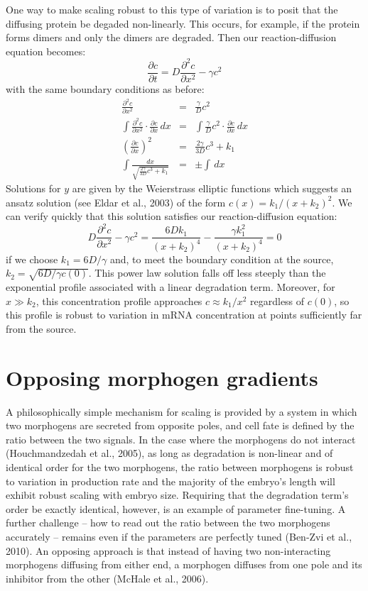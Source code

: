 \documentclass{article}
\begin{document}
One way to make scaling robust to this type of variation is to posit that the diffusing protein be degaded non-linearly. This occurs, for example, if the protein forms dimers and only the dimers are degraded. Then our reaction-diffusion equation becomes:
\[ \frac{\partial c}{\partial t} = D \frac{\partial^2 c}{\partial x^2} - \gamma c^2 \]
with the same boundary conditions as before:
\begin{eqnarray*}
 \frac{\partial^2 c}{\partial x^2} & = & \frac{\gamma}{D} c^2\\
\int  \frac{\partial^2 c}{\partial x^2} \cdot \frac{\partial c}{\partial x} \, dx & = & \int  \frac{\gamma}{D} c^2 \cdot \frac{\partial c}{\partial x} \, dx\\
\left(\frac{\partial c}{\partial x} \right)^2 & = &  \frac{2 \gamma}{3D} c^3 + k_1\\
\int \frac{dx}{\sqrt{\frac{2 \gamma}{3D} c^3 + k_1}} & = & \pm \int \, dx
\end{eqnarray*}
Solutions for $y$ are given by the Weierstrass elliptic functions which suggests an ansatz solution (see Eldar et al., 2003) of the form $c(x)= k_1/(x+k_2)^2$. We can verify quickly that this solution satisfies our reaction-diffusion equation:
\[ D \frac{\partial^2 c}{\partial x^2} - \gamma c^2 = \frac{6D k_1}{\left(x+k_2\right)^4} - \frac{\gamma k_1^2}{\left(x+k_2\right)^4} = 0 \]
if we choose $k_1=6D/\gamma$ and, to meet the boundary condition at the source, $k_2=\sqrt{6D/\gamma c(0)}$. This power law solution falls off less steeply than the exponential profile associated with a linear degradation term. Moreover, for $x \gg k_2$, this concentration profile approaches $c\approx k_1/x^2$ regardless of $c(0)$, so this profile is robust to variation in mRNA concentration at points sufficiently far from the source.

\section*{Opposing morphogen gradients}

A philosophically simple mechanism for scaling is provided by a system in which two morphogens are secreted from opposite poles, and cell fate is defined by the ratio between the two signals. In the case where the morphogens do not interact (Houchmandzedah et al., 2005), as long as degradation is non-linear and of identical order for the two morphogens, the ratio between morphogens is robust to variation in production rate and the majority of the embryo's length will exhibit robust scaling with embryo size. Requiring that the degradation term's order be exactly identical, however, is an example of parameter fine-tuning. A further challenge -- how to read out the ratio between the two morphogens accurately -- remains even if the parameters are perfectly tuned (Ben-Zvi et al., 2010). An opposing approach is that instead of having two non-interacting morphogens diffusing from either end, a morphogen diffuses from one pole and its inhibitor from the other (McHale et al., 2006).
\end{document}
